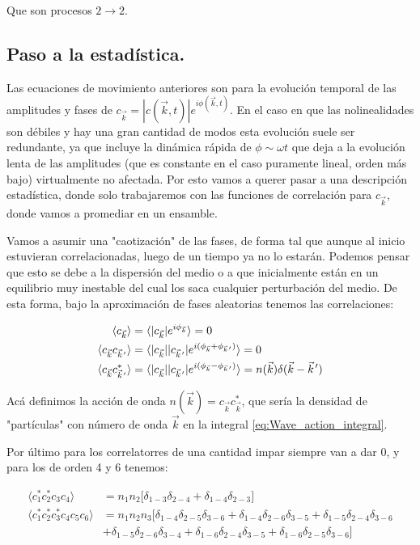 Que son procesos $2\rightarrow2$.

\subsection*{Paso a la estadística.}
Las ecuaciones de movimiento anteriores son para la evolución temporal de las amplitudes y fases de $c_{\vec k} = |c(\vec k, t)|e^{i\phi(\vec k, t)}$. En el caso en que las nolinealidades son débiles y hay una gran cantidad de modos esta evolución suele ser redundante, ya que incluye la dinámica rápida de $\phi\sim\omega t$ que deja a la evolución lenta de las amplitudes (que es constante en el caso puramente lineal, orden más bajo) virtualmente no afectada. Por esto vamos a querer pasar a una descripción estadística, donde solo trabajaremos con las funciones de correlación para $c_{\vec k}$, donde vamos a promediar en un ensamble.

Vamos a asumir una "caotización" de las fases, de forma tal que aunque al inicio estuvieran correlacionadas, luego de un tiempo ya no lo estarán. Podemos pensar que esto se debe a la dispersión del medio o a que inicialmente están en un equilibrio muy inestable del cual los saca cualquier perturbación del medio. De esta forma, bajo la aproximación de fases aleatorias tenemos las correlaciones:

\begin{equation}
	\begin{split}
		\langle c_{\vec k}\rangle &= \langle |c_{\vec k}|e^{i\phi_{\vec k}}	 \rangle = 0 \\
		\langle c_{\vec k} c_{\pvec k'} \rangle &= \langle |c_{\vec k}||c_{\pvec k'}| e^{i(\phi_{\vec k}+\phi_{\pvec k'})} \rangle = 0 \\
		\langle c_{\vec k} c^*_{\pvec k'} \rangle  &= \langle |c_{\vec k}||c_{\pvec k'}| e^{i(\phi_{\vec k}-\phi_{\pvec k'})} \rangle = n(\vec k) \delta(\vec k - \pvec k')
	\end{split}
\end{equation} 

Acá definimos la acción de onda $n(\vec k) = c_{\vec k}c^*_{\vec k}$, que sería la densidad de "partículas" con número de onda $\vec k$ en la integral \eqref{eq:Wave_action_integral}.  

Por último para los correlatorres de una cantidad impar siempre van a dar 0, y para los de orden 4 y 6 tenemos:

\begin{equation}
	\begin{split}
		\langle	c_1^*c_2^*c_3c_4 \rangle & = n_1 n_2 \big[\delta_{1-3}\delta_{2-4} + \delta_{1-4}\delta_{2-3}\big] \\ 
		\langle c_1^*c_2^*c_3^*c_4c_5c_6 \rangle &= n_1n_2n_3\big[  \delta_{1-4}\delta_{2-5}\delta_{3-6} + \delta_{1-4}\delta_{2-6}\delta_{3-5} + \delta_{1-5}\delta_{2-4}\delta_{3-6} \\ 
		& +\delta_{1-5}\delta_{2-6}\delta_{3-4} + \delta_{1-6}\delta_{2-4}\delta_{3-5} + \delta_{1-6}\delta_{2-5}\delta_{3-6} \big] 
	\end{split}
\end{equation}

